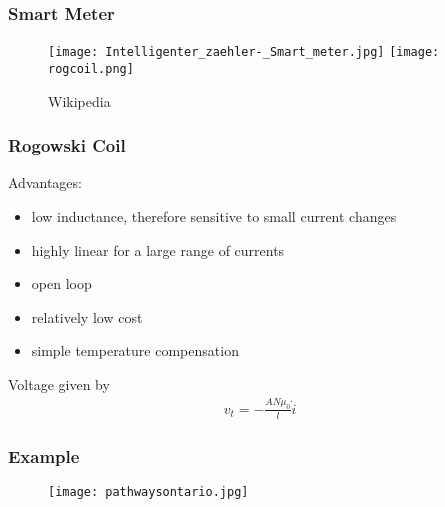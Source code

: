 \documentclass[10pt,dvipsnames]{beamer}
\let\olditem\item
\renewcommand{\item}{%
\olditem\vspace{5pt}}
\begin{document}
%

\begin{frame}
  \frametitle{Smart Meter}
  \begin{figure}
     \texttt{[image: Intelligenter\_zaehler-\_Smart\_meter.jpg]}
      \texttt{[image: rogcoil.png]}
  \caption{Wikipedia}
  \end{figure}


\end{frame}
\begin{frame}
 \frametitle{Rogowski Coil}
 Advantages:
 \begin{itemize}
  \item low inductance, therefore sensitive to small current changes
  \item highly linear for a large range of currents
  \item open loop
  \item relatively low cost
  \item simple temperature compensation
 \end{itemize}
 Voltage given by
 \begin{align*}
  v_t = - \frac{A N \mu_0}{l} \dot{i}
 \end{align*}

\end{frame}

\begin{frame}
 \frametitle{Example}
  \begin{figure}
     \texttt{[image: pathwaysontario.jpg]}

  \end{figure}

\end{frame}
\end{document}
